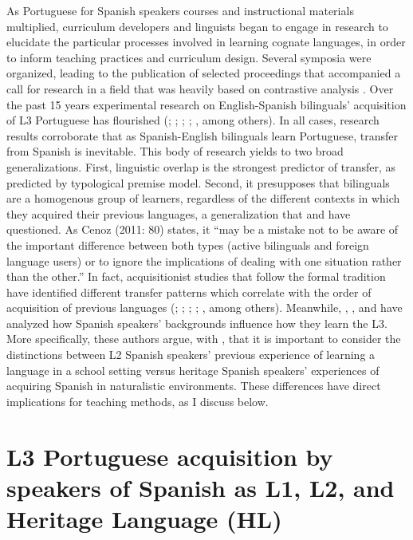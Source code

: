 \documentclass[output=paper]{../langscibook}
\begin{document}
As Portuguese for Spanish speakers courses and instructional materials multiplied, curriculum developers and linguists began to engage in research to elucidate the particular processes involved in learning cognate languages, in order to inform teaching practices and curriculum design. Several symposia were organized, leading to the publication of selected proceedings \citep{SimoesEtAl2004,WiedemannScaramucci2008} that accompanied a call for research in a field that was heavily based on contrastive analysis \citep{Carvalho2002}. Over the past 15 years experimental research on English-Spanish bilinguals’ acquisition of L3 Portuguese has flourished (\citealt{Allegro2010}; \citealt{Bailey2013}; \citealt{FeidenEtAl2014}; \citealt{Silva2015}; \citealt{TrudeTokowicz2011}, among others). In all cases, research results corroborate that as Spanish-English bilinguals learn Portuguese, transfer from Spanish is inevitable. This body of research yields to two broad generalizations. First, linguistic overlap is the strongest predictor of transfer, as predicted by  typological premise model. Second, it presupposes that bilinguals are a homogenous group of learners, regardless of the different contexts in which they acquired their previous languages, a generalization that \citet{Carvalho2002} and \citet{Cenoz2011} have questioned. As Cenoz (2011: 80) states, it “may be a mistake not to be aware of the important difference between both types (active bilinguals and foreign language users) or to ignore the implications of dealing with one situation rather than the other.” In fact, acquisitionist studies that follow the formal tradition have identified different transfer patterns which correlate with the order of acquisition of previous languages (\citealt{CabrelliAmaroWrembel2016}; \citealt{ChildEtAl2017}; \citealt{Silva2015}; \citealt{GiancasproEtAl2015}; \citealt{Rothman2010}, among others). Meanwhile, \citet{CarvalhoSilva2006}, \citet{CarvalhoChild2018}, and \citet{KoikeFlanzer2004} have analyzed how Spanish speakers’ backgrounds influence how they learn the L3. More specifically, these authors argue, with \citet{Cenoz2011}, that it is important to consider the distinctions between L2 Spanish speakers’ previous experience of learning a language in a school setting versus heritage Spanish speakers’ experiences of acquiring Spanish in naturalistic environments. These differences have direct implications for teaching methods, as I discuss below.

 \section{L3 Portuguese acquisition by speakers of Spanish as L1, L2, and Heritage Language (HL)}
\end{document}
